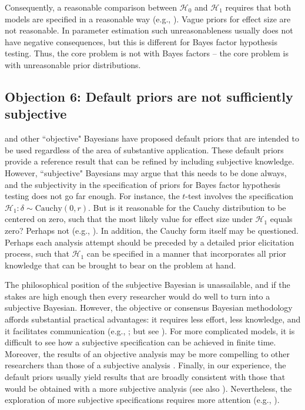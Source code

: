 Consequently, a reasonable comparison between $\mathcal{H}_0$ and $\mathcal{H}_1$ requires that both models are specified in a reasonable way (e.g., ). Vague priors for effect size are not reasonable. In parameter estimation such unreasonableness usually does not have negative consequences, but this is different for Bayes factor hypothesis testing. Thus, the core problem is not with Bayes factors -- the core problem is with unreasonable prior distributions.

\subsection{Objection 6: Default priors are not sufficiently subjective}
 and other ``objective" Bayesians have proposed default priors that are intended to be used regardless of the area of substantive application. These default priors provide a reference result that can be refined by including subjective knowledge. However, ``subjective" Bayesians may argue that this needs to be done always, and the subjectivity in the specification of priors for Bayes factor hypothesis testing does not go far enough. For instance, the $t$-test involves the specification $\mathcal{H}_1: \delta \sim \text{Cauchy}(0,r)$. But is it reasonable for the Cauchy distribution to be centered on zero, such that the most likely value for effect size under $\mathcal{H}_1$ equals zero? Perhaps not (e.g., ). In addition, the Cauchy form itself may be questioned. Perhaps each analysis attempt should be preceded by a detailed prior elicitation process, such that $\mathcal{H}_1$ can be specified in a manner that incorporates all prior knowledge that can be brought to bear on the problem at hand.

The philosophical position of the subjective Bayesian is unassailable, and if the stakes are high enough then every researcher would do well to turn into a subjective Bayesian. However, the objective or consensus Bayesian methodology affords substantial practical advantages: it requires less effort, less knowledge, and it facilitates communication (e.g., ; but see ). For more complicated models, it is difficult to see how a subjective specification can be achieved in finite time. Moreover, the results of an objective analysis may be more compelling to other researchers than those of a subjective analysis \cite{MoreyEtAlinpressHH}. Finally, in our experience, the default priors usually yield results that are broadly consistent with those that would be obtained with a more subjective analysis (see also ). Nevertheless, the exploration of more subjective specifications requires more attention (e.g., ).

